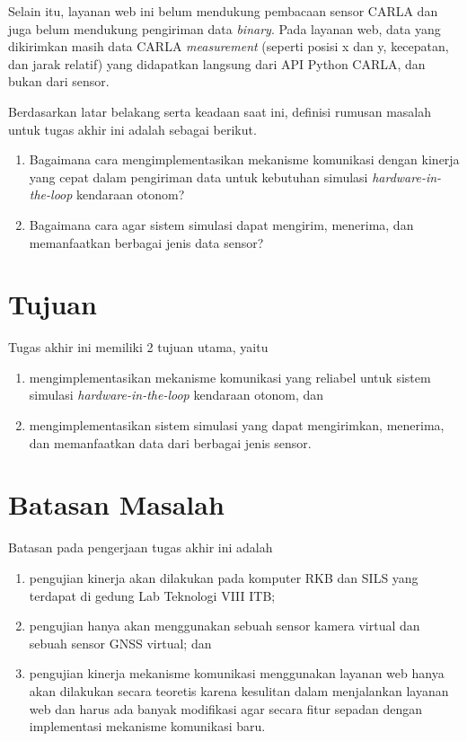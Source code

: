 Selain itu, layanan web ini belum mendukung pembacaan sensor CARLA dan juga
belum mendukung pengiriman data \textit{binary}. Pada layanan web, data yang
dikirimkan masih data CARLA \textit{measurement} (seperti posisi x dan y,
kecepatan, dan jarak relatif) yang didapatkan langsung dari API Python CARLA,
dan bukan dari sensor.

Berdasarkan latar belakang serta keadaan saat ini, definisi rumusan masalah
untuk tugas akhir ini adalah sebagai berikut.
\begin{enumerate}
	\item Bagaimana cara mengimplementasikan mekanisme komunikasi dengan kinerja
	      yang cepat dalam pengiriman data untuk kebutuhan simulasi
	      \textit{hardware-in-the-loop} kendaraan otonom?
	\item Bagaimana cara agar sistem simulasi dapat mengirim, menerima, dan
	      memanfaatkan berbagai jenis data sensor?
\end{enumerate}

\section{Tujuan}

Tugas akhir ini memiliki 2 tujuan utama, yaitu
\begin{enumerate}
	\item mengimplementasikan mekanisme komunikasi yang reliabel untuk sistem
	      simulasi \textit{hardware-in-the-loop} kendaraan otonom, dan
	\item mengimplementasikan sistem simulasi yang dapat mengirimkan,
	      menerima, dan memanfaatkan data dari berbagai jenis sensor.
\end{enumerate}

\section{Batasan Masalah}

Batasan pada pengerjaan tugas akhir ini adalah

\begin{enumerate}
	\item pengujian kinerja akan dilakukan pada komputer RKB dan SILS yang
	      terdapat di gedung Lab Tek\-no\-lo\-gi VIII ITB;
	\item pengujian hanya akan menggunakan sebuah sensor kamera virtual dan
	      sebuah sensor GNSS virtual; dan
	\item pengujian kinerja mekanisme komunikasi menggunakan layanan web hanya akan
	      dilakukan secara teoretis karena kesulitan dalam menjalankan layanan web
	      dan harus ada banyak modifikasi agar secara fitur sepadan dengan
	      implementasi mekanisme komunikasi baru. %
\end{enumerate}

